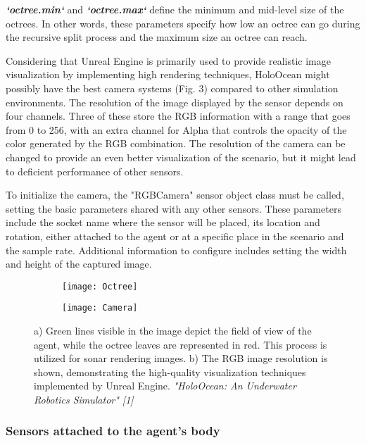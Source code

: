 \documentclass[]{article}
\begin{document}
	\textbf{\textit{`octree.min`}} and \textbf{\textit{`octree.max`}} define the minimum and mid-level size of the octrees. In other words, these parameters specify how low an octree can go during the recursive split process and the maximum size an octree can reach.
	
	Considering that Unreal Engine is primarily used to provide realistic image visualization by implementing high rendering techniques, HoloOcean might possibly have the best camera systems (Fig. 3) compared to other simulation environments. The resolution of the image displayed by the sensor depends on four channels. Three of these store the RGB information with a range that goes from 0 to 256, with an extra channel for Alpha that controls the opacity of the color generated by the RGB combination. The resolution of the camera can be changed to provide an even better visualization of the scenario, but it might lead to deficient performance of other sensors.
	
	To initialize the camera, the "RGBCamera" sensor object class must be called, setting the basic parameters shared with any other sensors. These parameters include the socket name where the sensor will be placed, its location and rotation, either attached to the agent or at a specific place in the scenario and the sample rate. Additional information to configure includes setting the width and height of the captured image.
	
	\begin{figure}
		\begin{subfigure}{.5\textwidth}
				\centering
				\texttt{[image: Octree]}
				\caption{}
			\end{subfigure}
		\begin{subfigure}{.5\textwidth}
				\centering
				\texttt{[image: Camera]}
				\caption{}
			\end{subfigure}
		\caption{a) Green lines visible in the image depict the field of view of the agent, while the octree leaves are represented in red. This process is utilized for sonar rendering images. b) The RGB image resolution is shown, demonstrating the high-quality visualization techniques implemented by Unreal Engine. \textit{"HoloOcean: An Underwater Robotics Simulator" [1]}}
	\end{figure}
			
			
			
	\subsubsection{Sensors attached to the agent's body}
	
\end{document}
